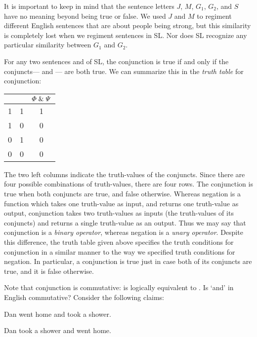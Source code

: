 It is important to keep in mind that the sentence letters $J$, $M$, $G_{1}$, $G_{2}$, and $S$ have no meaning beyond being true or false.
We used $J$ and $M$ to regiment different English sentences that are about people being strong, but this similarity is completely lost when we regiment sentences in SL.
Nor does SL recognize any particular similarity between $G_{1}$ and $G_{2}$.

For any two sentences \metaA{} and \metaB{} of SL, the conjunction \metaA{}\eand\metaB{} is true if and only if the conjuncts--- \metaA{} and \metaB{}--- are both true. We can summarize this in the \textit{truth table} for conjunction:
\begin{center}
\begin{tabular}{c|c|c}
\metaA{} & \metaB{} & $\varPhi{} \mathrel\& \varPsi{}$\\
\hline
1 & 1 & 1\\
1 & 0 & 0\\
0 & 1 & 0\\
0 & 0 & 0
\end{tabular}
\end{center}

The two left columns indicate the truth-values of the conjuncts.
Since there are four possible combinations of truth-values, there are four rows.
The conjunction is true when both conjuncts are true, and false otherwise.
Whereas negation is a function which takes one truth-value as input, and returns one truth-value as output, conjunction takes two truth-values as inputs (the truth-values of its conjuncts) and returns a single truth-value as an output. 
Thus we may say that conjunction is a \textit{binary operator}, whereas negation is a \textit{unary operator}.
Despite this difference, the truth table given above specifies the truth conditions for conjunction in a similar manner to the way we specified truth conditions for negation.
In particular, a conjunction is true just in case both of its conjuncts are true, and it is false otherwise.

Note that conjunction is commutative: \metaA{}\eand\metaB{} is logically equivalent to \metaB{}\eand\metaA{}.
Is `and' in English commutative?
Consider the following claims:

\begin{earg}
\item[\ex{and8}] Dan went home and took a shower.
\item[\ex{and9}] Dan took a shower and went home.
\end{earg}

